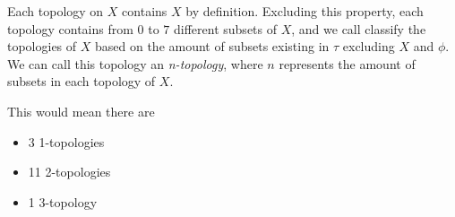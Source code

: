 \documentclass{report}
\begin{document}
\sol Each topology on $X$ contains $X$ by definition. Excluding this property, each topology contains from $0$ to $7$ different subsets of $X$, and we call classify the topologies of $X$ based on the amount of subsets existing in $\tau$ excluding $X$ and $\phi$. We can call this topology an \textit{n-topology}, where $n$ represents the amount of subsets in each topology of $X$. 



         This would mean there are 
\begin{center}
    \begin{itemize}
         \item 3 1-topologies
         \item 11 2-topologies
         \item 1 3-topology
    \end{itemize}
\end{center}
\end{document}
